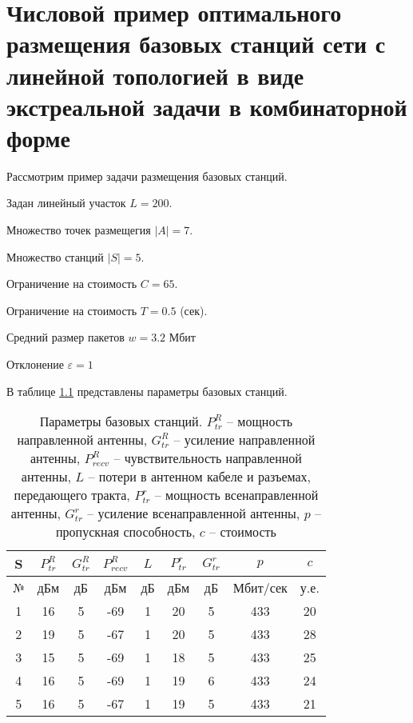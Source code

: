 \chapter{Числовой пример оптимального размещения базовых станций сети с линейной топологией в виде экстреальной задачи в комбинаторной форме}\label{app:bnb_solution}

Рассмотрим пример задачи размещения базовых станций.

Задан линейный участок $L =200$. 

Множество точек размещегия $|A| =7$.

Множество станций $|S| = 5$.

Ограничение на стоимость $C = 65$.

Ограничение на стоимость $T =0.5$ (сек).

Средний размер пакетов $w =3.2$ Мбит

Отклонение $\varepsilon=1$%

В таблице \cref{tab:sta_parameters} представлены параметры базовых станций.


\begin{table}[h!]\centering
    \begin{tabular}{|c||c|c|c|c|c|c|c|c|}\hline
        
        S&	$P_{tr}^R$&	$G_{tr}^R$&	$P_{recv}^R$&	$L$&	$P_{tr}^r$&	$G_{tr}^r$&	$p$&	$c$ \\
        \hline
        №&	дБм&	дБ&	дБм&	дБ&	дБм&	дБ&	Мбит/сек&	у.е. \\
        \hline
        1&	16&	5&	-69&	1&	20&	5&	433&	20 \\
        2&	19&	5&	-67&	1&	20&	5&	433&	28 \\
        3&	15&	5&	-69&	1&	18&	5&	433&	25 \\
        4&	16&	5&	-69&	1&	19&	6&	433&	24 \\
        5&	16&	5&	-67&	1&	19&	5&	433&	21 \\
        \hline

  \end{tabular}\caption{Параметры базовых станций. $P_{tr}^{R}$ -- мощность направленной антенны, $G_{tr}^R$ -- усиление направленной антенны, $P_{recv}^R$ -- чувствительность направленной антенны, $L$  -- потери в антенном кабеле и разъемах, передающего тракта, $P_{tr}^r$ -- мощность всенаправленной антенны, $G_{tr}^r$ -- усиление всенаправленной антенны,  $p$ – пропускная способность, $c$ – стоимость}\label{tab:sta_parameters}
  \end{table}

